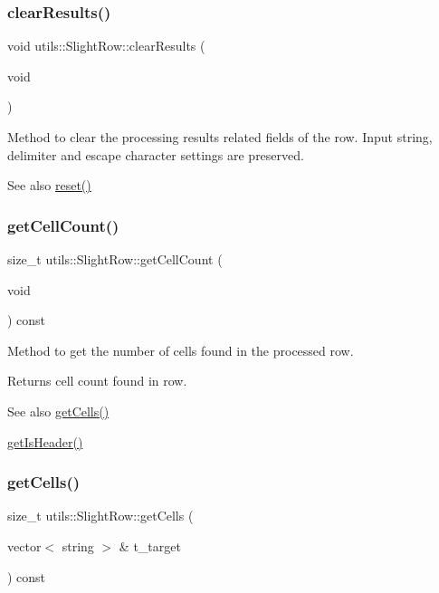 \subsubsection{\texorpdfstring{clear\+Results()}{clearResults()}}
{\footnotesize\ttfamily void utils\+::\+Slight\+Row\+::clear\+Results (\begin{DoxyParamCaption}\item[{void}]{ }\end{DoxyParamCaption})}

Method to clear the processing results related fields of the row. Input string, delimiter and escape character settings are preserved. \begin{DoxySeeAlso}{See also}
\hyperlink{classutils_1_1SlightRow_ad323829080b35608b2e5764ed735d4dc}{reset()} 
\end{DoxySeeAlso}
\mbox{\label{classutils_1_1SlightRow_af7df52464ce8151d7c3c429d0a796c7f}} 
\subsubsection{\texorpdfstring{get\+Cell\+Count()}{getCellCount()}}
{\footnotesize\ttfamily size\+\_\+t utils\+::\+Slight\+Row\+::get\+Cell\+Count (\begin{DoxyParamCaption}\item[{void}]{ }\end{DoxyParamCaption}) const}

Method to get the number of cells found in the processed row. \begin{DoxyReturn}{Returns}
cell count found in row. 
\end{DoxyReturn}
\begin{DoxySeeAlso}{See also}
\hyperlink{classutils_1_1SlightRow_ab06e2a27035951ff80edf834b430c829}{get\+Cells()} 

\hyperlink{classutils_1_1SlightRow_a702f97c32ea40303cd83a540404a6eca}{get\+Is\+Header()} 
\end{DoxySeeAlso}
\mbox{\label{classutils_1_1SlightRow_ab06e2a27035951ff80edf834b430c829}} 
\subsubsection{\texorpdfstring{get\+Cells()}{getCells()}}
{\footnotesize\ttfamily size\+\_\+t utils\+::\+Slight\+Row\+::get\+Cells (\begin{DoxyParamCaption}\item[{vector$<$ string $>$ \&}]{t\+\_\+target }\end{DoxyParamCaption}) const}

